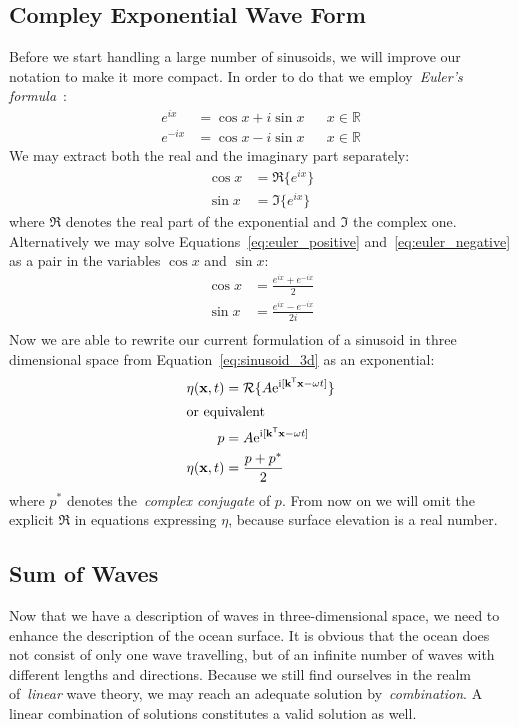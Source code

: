 \subsection{Compley Exponential Wave Form}
%
Before we start handling a large number of sinusoids, we will improve our
notation to make it more compact. In order to do that we employ~\emph{Euler's
formula}~\citep{Euler:1748}:
\begin{align}
\label{eq:euler_positive} e^{ix} &= \cos{x} + i\sin{x} && x \in \mathbb{R} \\
\label{eq:euler_negative} e^{-ix} &= \cos{x} - i\sin{x} && x \in \mathbb{R}
\end{align}
%
We may extract both the real and the imaginary part separately:
\begin{align*}
 \cos{x} &= \Re\{e^{ix}\} \\
 \sin{x} &= \Im\{e^{ix}\}
\end{align*}
where $\Re$ denotes the real part of the exponential and $\Im$ the
complex one. Alternatively we may solve Equations~\ref{eq:euler_positive}
and~\ref{eq:euler_negative} as a pair in the variables $\cos{x}$ and $\sin{x}$:
\begin{align*}
 \cos{x} &= \frac{e^{ix}+e^{-ix}}{2}\\
 \sin{x} &= \frac{e^{ix}-e^{-ix}}{2i}\\
\end{align*}
Now we are able to rewrite our current formulation of a sinusoid in three
dimensional space from Equation~\ref{eq:sinusoid_3d} as an exponential:
%
\begin{align}
\label{eq:sinusoid_exponential_sa} \eta(\mathbf{x}, t) &=
\mathcal{R}\{A\mathrm{e}^{\mathrm{i}[\mathbf{k}^{\mathsf{T}}\mathbf{x} -{\omega}t]}\} \\
\intertext{or equivalent}
 p &= A\mathrm{e}^{\mathrm{i}[\mathbf{k}^{\mathsf{T}}\mathbf{x} -
{\omega}t]} \\
 \eta(\mathbf{x}, t) &= \frac{p+p^*}{2}
\end{align}
%
where $p^*$ denotes the~\emph{complex conjugate} of $p$. From now on we will
omit the explicit $\Re$ in equations expressing $\eta$, because surface
elevation is a real number.
%
\subsection{Sum of Waves}
Now that we have a description of waves in three-dimensional space, we need to
enhance the description of the ocean surface. It is obvious that the ocean does
not consist of only one wave travelling, but of an infinite number of waves with
different lengths and directions. Because we still find ourselves in the realm
of~\emph{linear} wave theory, we may reach an adequate solution
by~\emph{combination}. A linear combination of solutions constitutes a valid
solution as well.

